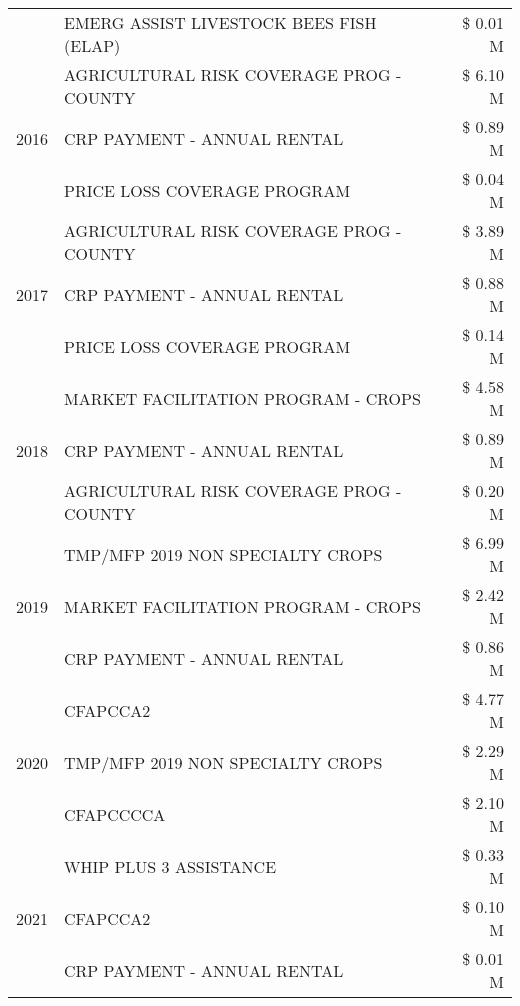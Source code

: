 \begin{tabular}{llr}
 & EMERG ASSIST LIVESTOCK BEES FISH (ELAP) & \$ 0.01 M \\
\cline{1-3}
\multirow[t]{3}{*}{2016} & AGRICULTURAL RISK COVERAGE PROG - COUNTY      & \$ 6.10 M \\
 & CRP PAYMENT - ANNUAL RENTAL                   & \$ 0.89 M \\
 & PRICE LOSS COVERAGE PROGRAM                   & \$ 0.04 M \\
\cline{1-3}
\multirow[t]{3}{*}{2017} & AGRICULTURAL RISK COVERAGE PROG - COUNTY & \$ 3.89 M \\
 & CRP PAYMENT - ANNUAL RENTAL & \$ 0.88 M \\
 & PRICE LOSS COVERAGE PROGRAM & \$ 0.14 M \\
\cline{1-3}
\multirow[t]{3}{*}{2018} & MARKET FACILITATION PROGRAM - CROPS & \$ 4.58 M \\
 & CRP PAYMENT - ANNUAL RENTAL & \$ 0.89 M \\
 & AGRICULTURAL RISK COVERAGE PROG - COUNTY & \$ 0.20 M \\
\cline{1-3}
\multirow[t]{3}{*}{2019} & TMP/MFP 2019 NON SPECIALTY CROPS & \$ 6.99 M \\
 & MARKET FACILITATION PROGRAM - CROPS & \$ 2.42 M \\
 & CRP PAYMENT - ANNUAL RENTAL & \$ 0.86 M \\
\cline{1-3}
\multirow[t]{3}{*}{2020} & CFAPCCA2 & \$ 4.77 M \\
 & TMP/MFP 2019 NON SPECIALTY CROPS & \$ 2.29 M \\
 & CFAPCCCCA & \$ 2.10 M \\
\cline{1-3}
\multirow[t]{3}{*}{2021} & WHIP PLUS 3 ASSISTANCE & \$ 0.33 M \\
 & CFAPCCA2 & \$ 0.10 M \\
 & CRP PAYMENT - ANNUAL RENTAL & \$ 0.01 M \\
\cline{1-3}
\bottomrule
\end{tabular}
